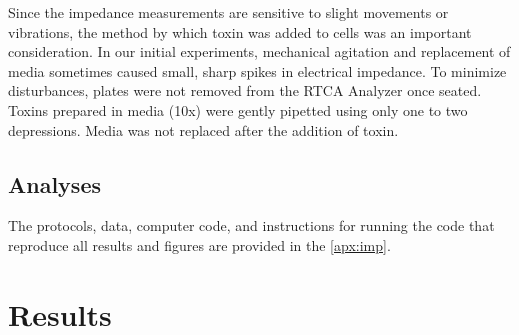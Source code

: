 Since the impedance measurements are sensitive to 
slight movements or vibrations, the method by which 
toxin was added to cells was an important consideration. 
In our initial experiments, mechanical agitation and 
replacement of media sometimes caused small, sharp 
spikes in electrical impedance. To minimize disturbances, 
plates were not removed from the RTCA Analyzer once 
seated. Toxins prepared in media (10x) were gently 
pipetted using only one to two depressions. Media was 
not replaced after the addition of toxin.

\subsection{Analyses}
The protocols, data, computer code, and instructions 
for running the code that reproduce all results and 
figures are provided in the \autoref{apx:imp}.


\section{Results}

